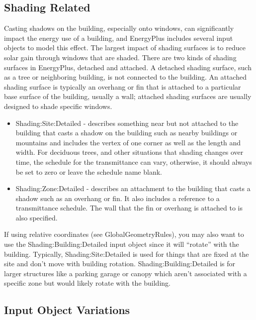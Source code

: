 \subsection*{Shading Related}

Casting shadows on the building, especially onto windows, can significantly
impact the energy use of a building, and EnergyPlus includes several
input objects to model this effect. The largest impact of shading
surfaces is to reduce solar gain through windows that are shaded.
There are two kinds of shading surfaces in EnergyPlus, detached and
attached. A detached shading surface, such as a tree or neighboring
building, is not connected to the building. An attached shading surface
is typically an overhang or fin that is attached to a particular base
surface of the building, usually a wall; attached shading surfaces
are usually designed to shade specific windows.
\begin{itemize}
\item Shading:Site:Detailed - describes something near but not attached
to the building that casts a shadow on the building such as nearby
buildings or mountains and includes the vertex of one corner as well
as the length and width. For deciduous trees, and other situations
that shading changes over time, the schedule for the transmittance
can vary, otherwise, it should always be set to zero or leave the
schedule name blank.
\item Shading:Zone:Detailed - describes an attachment to the building that
casts a shadow such as an overhang or fin. It also includes a reference
to a transmittance schedule. The wall that the fin or overhang is
attached to is also specified.
\end{itemize}
If using relative coordinates (see GlobalGeometryRules), you may also
want to use the Shading:Building:Detailed input object since it will
``rotate'' with the building. Typically, Shading:Site:Detailed is
used for things that are fixed at the site and don't move with building
rotation. Shading:Building:Detailed is for larger structures like
a parking garage or canopy which aren't associated with a specific
zone but would likely rotate with the building.

\subsection*{Input Object Variations}

